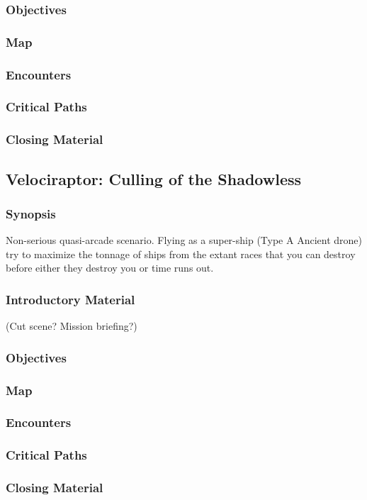 \subsubsection{Objectives}
\subsubsection{Map}
\subsubsection{Encounters}
\subsubsection{Critical Paths}
\subsubsection{Closing Material}

\subsection{Velociraptor: Culling of the Shadowless}
\subsubsection{Synopsis}
Non-serious quasi-arcade scenario. Flying as a super-ship (Type A
Ancient drone) try to maximize the tonnage of ships from the extant
races that you can destroy before either they destroy you or time runs
out.
\subsubsection{Introductory Material}
 (Cut scene?  Mission briefing?)
\subsubsection{Objectives}
\subsubsection{Map}
\subsubsection{Encounters}
\subsubsection{Critical Paths}
\subsubsection{Closing Material}


